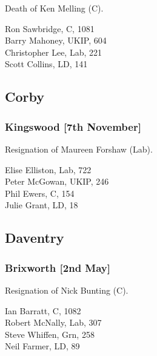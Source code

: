 \documentclass[a4paper,openany,10pt]{book}
\begin{document}
Death of Ken Melling (C).



Ron Sawbridge, C, 1081\\
Barry Mahoney, UKIP, 604\\
Christopher Lee, Lab, 221\\
Scott Collins, LD, 141\\


\subsection*{Corby}

\subsubsection*{Kingswood \hspace*{\fill}\nolinebreak[1]%
\enspace\hspace*{\fill}
[7th November]}


{Resignation of Maureen Forshaw (Lab).}



Elise Elliston, Lab, 722\\
Peter McGowan, UKIP, 246\\
Phil Ewers, C, 154\\
Julie Grant, LD, 18\\


\subsection*{Daventry}

\subsubsection*{Brixworth \hspace*{\fill}\nolinebreak[1]%
\enspace\hspace*{\fill}
[2nd May]}


Resignation of Nick Bunting (C).



Ian Barratt, C, 1082\\
Robert McNally, Lab, 307\\
Steve Whiffen, Grn, 258\\
Neil Farmer, LD, 89\\
\end{document}
